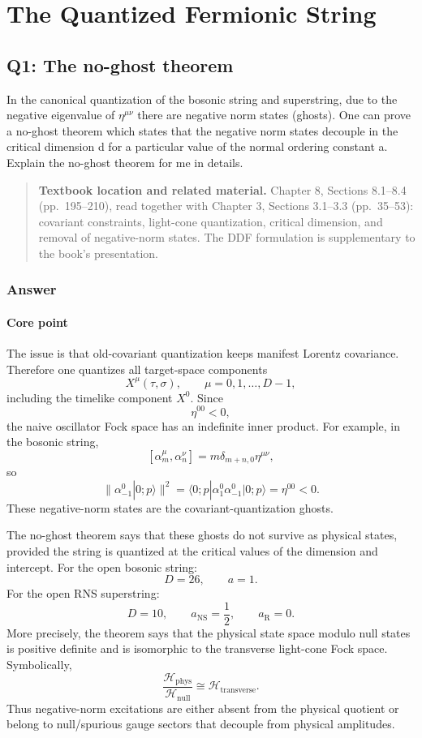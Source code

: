 \documentclass[
  10pt,
  a4paper,
  openany]{book}
\begin{document}
\chapter{The Quantized Fermionic
String}\label{the-quantized-fermionic-string-1}

\section{Q1: The no-ghost theorem}\label{q1-the-no-ghost-theorem}

In the canonical quantization of the bosonic string and superstring, due
to the negative eigenvalue of \(\eta^{\mu \nu}\) there are negative norm
states (ghosts). One can prove a no-ghost theorem which states that the
negative norm states decouple in the critical dimension d for a
particular value of the normal ordering constant a. Explain the no-ghost
theorem for me in details.

\begin{quote}
\textbf{Textbook location and related material.} Chapter 8, Sections
8.1--8.4 (pp.~195--210), read together with Chapter 3, Sections 3.1--3.3
(pp.~35--53): covariant constraints, light-cone quantization, critical
dimension, and removal of negative-norm states. The DDF formulation is
supplementary to the book's presentation.
\end{quote}

\subsection{Answer}\label{answer-12}

\subsubsection{Core point}\label{core-point-12}

The issue is that old-covariant quantization keeps manifest Lorentz
covariance. Therefore one quantizes all target-space components \[
X^\mu(\tau,\sigma),
\qquad
\mu=0,1,\dots,D-1,
\] including the timelike component \(X^0\). Since \[
\eta^{00}<0,
\] the naive oscillator Fock space has an indefinite inner product. For
example, in the bosonic string, \[
[\alpha_m^\mu,\alpha_n^\nu]
=
m\delta_{m+n,0}\eta^{\mu\nu},
\] so \[
\|\alpha_{-1}^0|0;p\rangle\|^2
=
\langle 0;p|\alpha_1^0\alpha_{-1}^0|0;p\rangle
=
\eta^{00}
<0.
\] These negative-norm states are the covariant-quantization ghosts.

The no-ghost theorem says that these ghosts do not survive as physical
states, provided the string is quantized at the critical values of the
dimension and intercept. For the open bosonic string: \[
D=26,
\qquad
a=1.
\] For the open RNS superstring: \[
D=10,
\qquad
a_{\text{NS}}=\frac{1}{2},
\qquad
a_{\text{R}}=0.
\] More precisely, the theorem says that the physical state space modulo
null states is positive definite and is isomorphic to the transverse
light-cone Fock space. Symbolically, \[
\frac{\mathcal H_{\text{phys}}}{\mathcal H_{\text{null}}}
\cong
\mathcal H_{\text{transverse}}.
\] Thus negative-norm excitations are either absent from the physical
quotient or belong to null/spurious gauge sectors that decouple from
physical amplitudes.
\end{document}
